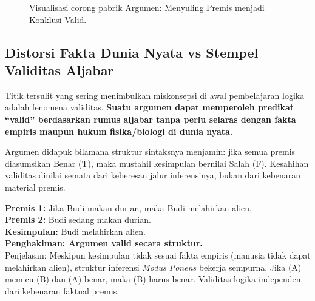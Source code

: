 \begin{figure}[htbp]
\centering
{}
\caption{Visualisasi corong pabrik Argumen: Menyuling Premis menjadi Konklusi Valid.}
\label{fig:struktur-argumen}
\end{figure}

\subsection{Distorsi Fakta Dunia Nyata vs Stempel Validitas Aljabar}

Titik tersulit yang sering menimbulkan miskonsepsi di awal pembelajaran logika adalah fenomena validitas. \textbf{Suatu argumen dapat memperoleh predikat ``valid'' berdasarkan rumus aljabar tanpa perlu selaras dengan fakta empiris maupun hukum fisika/biologi di dunia nyata.} \cite{forallx,copi2014}

\begin{definisi}
Argumen didapuk  bilamana struktur sintaksnya menjamin: jika semua premis diasumsikan Benar (T), maka mustahil kesimpulan bernilai Salah (F). Kesahihan validitas dinilai semata dari keberesan jalur inferensinya, bukan dari kebenaran material premis.
\end{definisi}

\begin{contoh}
\textbf{Premis 1:} Jika Budi makan durian, maka Budi melahirkan alien. \\
\textbf{Premis 2:} Budi sedang makan durian. \\
\textbf{Kesimpulan:} Budi melahirkan alien. \\
\textbf{Penghakiman: Argumen valid secara struktur.} \\
Penjelasan: Meskipun kesimpulan tidak sesuai fakta empiris (manusia tidak dapat melahirkan alien), struktur inferensi \textit{Modus Ponens} bekerja sempurna. Jika (A) memicu (B) dan (A) benar, maka (B) harus benar. Validitas logika independen dari kebenaran faktual premis.
\end{contoh}

